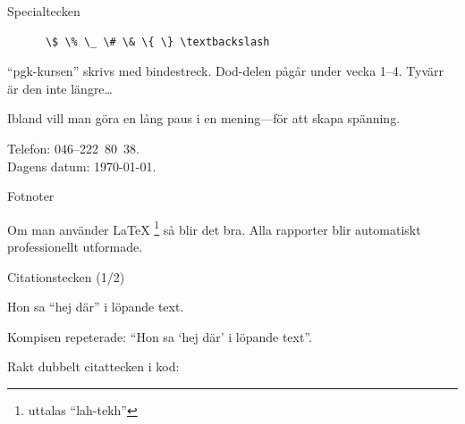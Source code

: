 \begin{Slide}{Specialtecken}

  \begin{itemize}
  \end{itemize}

    \begin{verbatim}
      \$ \% \_ \# \& \{ \} \textbackslash
    \end{verbatim}

  
  \begin{exlatex}
\enquote{pgk-kursen} skrivs med bindestreck.
Dod-delen pågår under vecka 1--4.
Tyvärr är den inte längre\ldots

Ibland vill man göra en lång paus i en mening---för att skapa spänning.

\quad Telefon: 046--222~80~38.\\
Dagens datum: \today.
  \end{exlatex}
\end{Slide}


\begin{Slide}{Fotnoter}


  \begin{exlatex}
  Om man använder \LaTeX
  \footnote{uttalas
    \enquote{lah-tekh}} så
  blir det bra. Alla rapporter
  blir automatiskt 
  professionellt
  utformade.
  \end{exlatex}

  \blankline
  \begin{itemize}
  \end{itemize}

\end{Slide}

\begin{Slide}{Citationstecken (1/2)}


\begin{exlatex}
Hon sa \enquote{hej där} i löpande text.

Kompisen repeterade: \enquote{Hon sa \enquote{hej där} i löpande text}.

Rakt dubbelt citattecken i kod: \texttt{\textquotedbl}
\end{exlatex}

\end{Slide}


